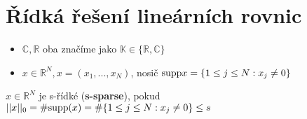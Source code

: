 \documentclass[../main.tex]{subfiles}
\begin{document}
\section{Řídká řešení lineárních rovnic}

\begin{itemize}
    \item $\mathbb{C}, \mathbb{R}$ oba značíme jako $\mathbb{K} \in \{\mathbb{R}, \mathbb{C}\}$
    \item $x\in\mathbb{R}^N, x = (x_1,..., x_N)$, nosič $\text{supp} x =\{1\leq j \leq N: x_j\neq0 \}$
\end{itemize}

\begin{definition}
    $x \in \mathbb{R}^N$ je s-řídké (\textbf{s-sparse}), pokud $||x||_0 = \# \text{supp} (x) = \# \{1\leq j\leq N: x_j\neq0\} \leq s$
\end{definition}
\end{document}
